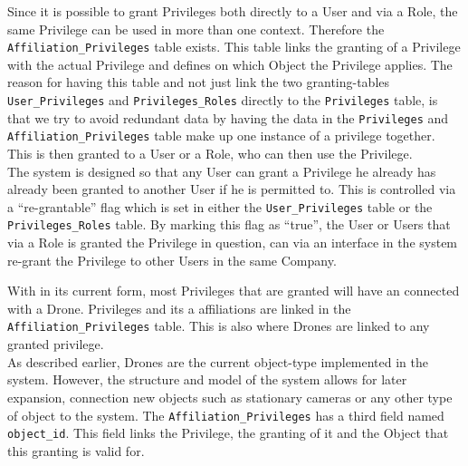 Since it is possible to grant Privileges both directly to a User and via a Role, the same Privilege can be used in more than one context.
Therefore the \verb+Affiliation_Privileges+ table exists.
This table links the granting of a Privilege with the actual Privilege and defines on which Object the Privilege applies.
The reason for having this table and not just link the two granting-tables \verb+User_Privileges+ and \verb+Privileges_Roles+ directly to the \verb+Privileges+ table, is that we try to avoid redundant data by having the data in the \verb+Privileges+ and \verb+Affiliation_Privileges+ table make up one instance of a privilege together.
This is then granted to a User or a Role, who can then use the Privilege. \\

The system is designed so that any User can grant a Privilege he already has already been granted to another User if he is permitted to.
This is controlled via a ``re-grantable'' flag which is set in either the \verb+User_Privileges+ table or the \verb+Privileges_Roles+ table.
By marking this flag as ``true'', the User or Users that via a Role is granted the Privilege in question, can via an interface in the system re-grant the Privilege to other Users in the same Company.




With \projectname{} in its current form, most Privileges that are granted will have an connected with a Drone.
Privileges and its a affiliations are linked in the \verb+Affiliation_Privileges+ table.
This is also where Drones are linked to any granted privilege. \\

As described earlier, Drones are the current object-type implemented in the system.
However, the structure and model of the system allows for later expansion, connection new objects such as stationary cameras or any other type of object to the system.
The \verb+Affiliation_Privileges+ has a third field named \verb+object_id+.
This field links the Privilege, the granting of it and the Object that this granting is valid for. \\

